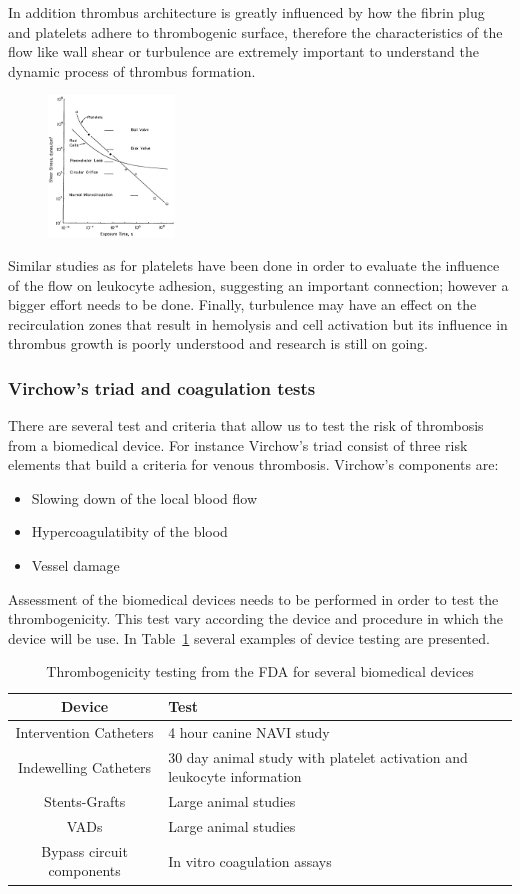 \documentclass[%
 nofootinbib,
 amsmath,amssymb,
 aps,
 pra,
]{revtex4-1}
\begin{document}
In addition thrombus architecture is greatly influenced by how the fibrin plug and platelets adhere to thrombogenic surface, therefore the characteristics of the flow like wall shear or turbulence are extremely important to understand the dynamic process of thrombus formation.
\begin{figure}[h]
\includegraphics[width=0.3\textwidth]{Figures/hellums_threshold}
\caption{\label{diag:ssthreshold}}
\end{figure}
Similar studies as for platelets have been done in order to evaluate the influence of the flow on leukocyte adhesion, suggesting an important connection; however a bigger effort needs to be done. Finally, turbulence may have an effect on the recirculation zones that result in hemolysis and cell activation but its influence in thrombus growth is poorly understood and research is still on going.\\
\subsubsection{Virchow's triad and coagulation tests}
There are several test and criteria that allow us to test the risk of thrombosis from a biomedical device. For instance Virchow's triad consist of three risk elements that build a criteria for venous thrombosis.
Virchow's components are: 
\begin{itemize}
\item Slowing down of the local blood flow
\item Hypercoagulatibity of the blood
\item Vessel damage
\end{itemize}
Assessment of the biomedical devices needs to be performed in order to test the thrombogenicity. This test vary according the device and procedure in which the device will be use. In Table~\ref{tab:Thrombogenicity} several examples of device testing are presented.
\begin{table}[h]
\begin{tabular}{c p{4.5cm}}
\hline
\textbf{Device} &  \textbf{Test}\\
\hline
Intervention Catheters & 4 hour canine NAVI study\\
Indewelling Catheters & 30 day animal study with platelet activation and leukocyte information\\
Stents-Grafts & Large animal studies\\
VADs & Large animal studies\\
Bypass circuit components & In vitro coagulation assays \\
\hline
\end{tabular}
\caption{\label{tab:Thrombogenicity} Thrombogenicity testing from the FDA for several biomedical devices}
\end{table} 
\end{document}
